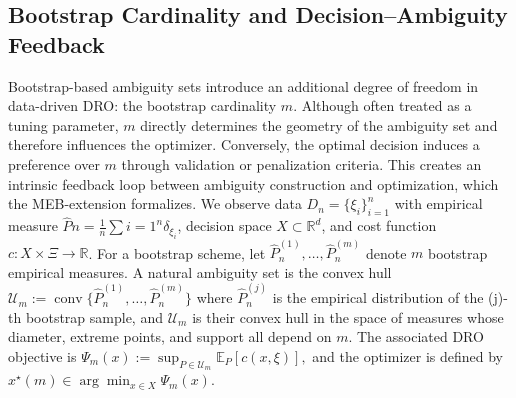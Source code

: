 \documentclass[ijoc,sglanonrev]{informs4}
\begin{document}
\subsection{Bootstrap Cardinality and Decision--Ambiguity Feedback} \label{Subsec:ambiguity}

Bootstrap-based ambiguity sets introduce an additional degree of freedom in data-driven DRO: the bootstrap cardinality $m$. Although often treated as a tuning parameter, $m$ directly determines the geometry of the ambiguity set and therefore influences the optimizer. Conversely, the optimal decision induces a preference over $m$ through validation or penalization criteria. This creates an intrinsic feedback loop between ambiguity construction and optimization, which the MEB-extension formalizes.
We observe data $D_n=\{\xi_i\}_{i=1}^n$ with empirical measure
$\widehat{P}n=\frac{1}{n}\sum{i=1}^n \delta_{\xi_i}$, decision space $X\subset\mathbb{R}^d$, and cost function $c:X\times\Xi\to\mathbb{R}$.  
For a bootstrap scheme, let $\widehat{P}_n^{(1)},\dots,\widehat{P}_n^{(m)}$ denote $m$ bootstrap empirical measures.  
A natural ambiguity set is the convex hull
$\mathcal{U}_m := \operatorname{conv}\{\widehat{P}_n^{(1)},\dots,\widehat{P}_n^{(m)}\}$	
where $\widehat{P}_n^{(j)}$ is the empirical distribution of the (j)-th bootstrap sample, and $\mathcal U_m$ is their convex hull in the space of measures whose diameter, extreme points, and support all depend on $m$.
The associated DRO objective is $\Psi_m(x) := \sup_{P\in\mathcal{U}_m} \mathbb{E}_P[c(x,\xi)],
$ and the optimizer is defined by $x^\star(m)\in\arg\min_{x\in X}\Psi_m(x)$.
\end{document}
